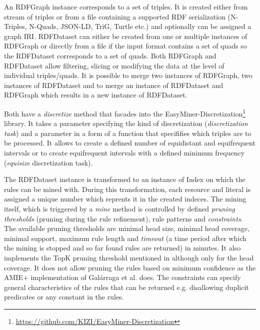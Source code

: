 An RDFGraph instance corresponds to a set of triples. It is created either from stream of triples or from a file containing a supported RDF serialization (N-Triples, N-Quads, JSON-LD, TriG, Turtle etc.) and optionally can be assigned a graph IRI. RDFDataset can either be created from one or multiple instances of RDFGraph or directly from a file if the input format contains a set of quads so the RDFDataset corresponds to a set of quads. Both RDFGraph and RDFDataset allow filtering, slicing or modifying the data at the level of individual triples/quads. It is possible to merge two instances of RDFGraph, two instances of RDFDataset and to merge an instance of RDFDataset and RDFGraph which results in a new instance of RDFDataset.

Both have a \textit{discretize} method that facades into the EasyMiner-Discretization\footnote{\href{https://github.com/KIZI/EasyMiner-Discretization}{https://github.com/KIZI/EasyMiner-Discretization}} library. It takes a parameter specifying the kind of discretization (\textit{discretization task}) and a parameter in a form of a function that specififies which triples are to be processed. It allows to create a defined number of equidistant and equifrequent intervals or to create equifrequent intervals with a defined minimum frequency (\textit{equisize} discretization task).

The RDFDataset instance is transformed to an instance of Index on which the rules can be mined with. During this transformation, each resource and literal is assigned a unique number which reprents it in the created indeces. The mining itself, which is triggered by a \textit{mine} method is controlled by defined \textit{pruning thresholds} (pruning during the rule refinement), rule patterns and \textit{constraints}. The available pruning thresholds are minimal head size, minimal head coverage, minimal support, maximum rule length and \textit{timeout} (a time period after which the mining is stopped and so far found rules are returned) in minutes. It also implements the TopK pruning threshold mentioned in \cite{Zeman2020} although only for the head coverage. It does not allow pruning the rules based on minimum confidence as the AMIE+ implementation of Galárraga et al. does. The constraints can specify general characteristics of the rules that can be returned e.g. disallowing duplicit predicates or any constant in the rules.

